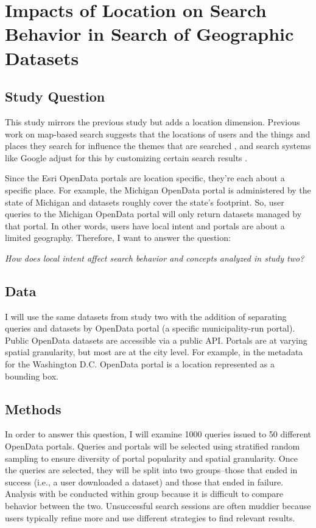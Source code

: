 \section{Impacts of Location on Search Behavior in Search of Geographic  Datasets}

\subsection{Study Question}
This study mirrors the previous study but adds a location dimension. Previous work on map-based search suggests that the locations of users and the things and places they search for influence the themes that are searched \cite{Xiao2010}, and search systems like Google adjust for this by customizing certain search results \cite{Kliman-Silver2015}.

Since the Esri OpenData portals are location specific, they’re each about a specific place. For example, the Michigan OpenData portal is administered by the state of Michigan and datasets roughly cover the state’s footprint. So, user queries to the Michigan OpenData portal will only return datasets managed by that portal. In other words, users have local intent and portals are about a limited geography. Therefore, I want to answer the question:
\linebreak

\emph{How does local intent affect search behavior and concepts analyzed in study two?}
\linebreak

\subsection{Data}
I will use the same datasets from study two with the addition of separating queries and datasets by OpenData portal (a specific municipality-run portal). Public OpenData datasets are accessible via a public API. Portals are at varying spatial granularity, but most are at the city level. For example, in the metadata for the Washington D.C. OpenData portal is a location represented as a bounding box.

\subsection{Methods}
In order to answer this question, I will examine 1000 queries issued to 50 different OpenData portals. Queries and portals will be selected using stratified random sampling to ensure diversity of portal popularity and spatial granularity. Once the queries are selected, they will be split into two groups–those that ended in success (i.e., a user downloaded a dataset) and those that ended in failure. Analysis with be conducted within group because it is difficult to compare behavior between the two. Unsuccessful search sessions are often muddier because users typically refine more and use different strategies to find relevant results.

